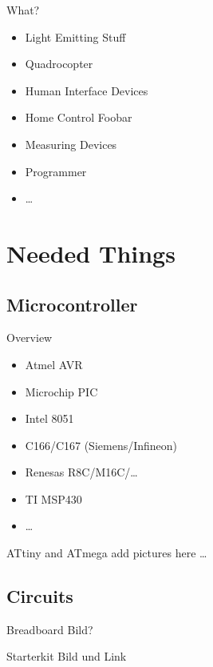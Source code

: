 \documentclass{beamer}
\begin{document}
\begin{frame}{What?}
    \begin{itemize}
        \item Light Emitting Stuff
        \item Quadrocopter
        \item Human Interface Devices
        \item Home Control Foobar
        \item Measuring Devices
        \item Programmer
        \item \dots
    \end{itemize}
\end{frame}

\section{Needed Things}

\subsection{Microcontroller}

\begin{frame}{Overview}
    \begin{itemize}
        \item Atmel AVR
        \item Microchip PIC
        \item Intel 8051
        \item C166/C167 (Siemens/Infineon)
        \item Renesas R8C/M16C/…
        \item TI MSP430
        \item …
    \end{itemize}
\end{frame}

\begin{frame}{ATtiny and ATmega}
    add pictures here \dots
\end{frame}

\subsection{Circuits}

\begin{frame}{Breadboard}
    Bild?
\end{frame}

\begin{frame}{Starterkit}
    Bild und Link
\end{frame}
\end{document}

